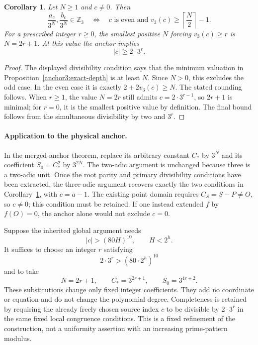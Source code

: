\documentclass[11pt,a4paper]{article}
\newtheorem{corollary}[theorem]{Corollary}
\theoremstyle{definition}
\theoremstyle{remark}
\begin{document}
\begin{corollary}\label{anchor3:integer-cutoff}
Let $N\ge1$ and $c\ne0$.  Then
\[
 \frac{a_c}{3^N},\frac{b_c}{3^N}\in\mathbb Z_3
 \quad\Longleftrightarrow\quad
 c\text{ is even and }v_3(c)\ge\left\lceil\frac N2\right\rceil-1.
\]
For a prescribed integer $r\ge0$, the smallest positive $N$ forcing
$v_3(c)\ge r$ is $N=2r+1$.  At this value the anchor implies
\[
                             |c|\ge2\cdot3^r.
\]
\end{corollary}
\begin{proof}
The displayed divisibility condition says that the minimum valuation in
Proposition~\ref{anchor3:exact-depth} is at least $N$.  Since $N>0$,
this excludes the odd case.  In the even case it is exactly
$2+2v_3(c)\ge N$.  The stated rounding follows.  When $r\ge1$,
the value $N=2r$ still admits $c=2\cdot3^{r-1}$, so $2r+1$ is
minimal; for $r=0$, it is the smallest positive value by definition.
The final bound follows from the simultaneous divisibility by two and
$3^r$.
\end{proof}

\paragraph{Application to the physical anchor.}
In the merged-anchor theorem, replace its arbitrary constant $C_*$ by
$3^N$ and its coefficient $S_0=C_*^2$ by $3^{2N}$.
The two-adic argument is unchanged because three is a two-adic unit.
Once the root parity and primary divisibility conditions have been
extracted, the three-adic argument recovers exactly the two conditions
in Corollary~\ref{anchor3:integer-cutoff}, with $c=a-1$.
The existing point domain requires $C_S=S-P\ne O$, so $c\ne0$;
this condition must be retained.  If one instead extended $f$ by
$f(O)=0$, the anchor alone would not exclude $c=0$.

Suppose the inherited global argument needs
\[
                     |c|>(80H)^{10},\qquad H<2^h.
\]
It suffices to choose an integer $r$ satisfying
\[
                       2\cdot3^r>(80\cdot2^h)^{10}
\]
and to take
\[
                   N=2r+1,\qquad C_*=3^{2r+1},
                   \qquad S_0=3^{4r+2}.
\]
These substitutions change only fixed integer coefficients.  They add
no coordinate or equation and do not change the polynomial degree.
Completeness is retained by requiring the already freely chosen source
index $c$ to be divisible by $2\cdot3^r$ in the same fixed local
congruence conditions.  This is a fixed refinement of the construction,
not a uniformity assertion with an increasing prime-pattern modulus.
\end{document}
